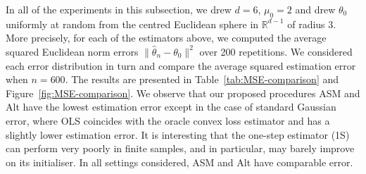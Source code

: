 \documentclass[a4paper]{article}
\newcommand{\norm}[1]{\|{#1}\|}
\theoremstyle{definition}
\newcommand{\green}[1]{{\color{green!70!black}#1}}
\begin{document}
In all of the experiments in this subsection, we drew $d = 6$, $\mu_0 = 2$ and drew $\theta_0$ uniformly at random from the centred Euclidean sphere in $\mathbb{R}^{d-1}$ of radius 3.  More precisely, for each of the estimators above, we computed the average squared Euclidean norm errors $\norm{\hat{\theta}_n - \theta_0}^2$ over 200 repetitions. We considered each error distribution in turn and compare the average squared estimation error when $n = 600$. The results are presented in Table~\ref{tab:MSE-comparison} and Figure~\ref{fig:MSE-comparison}. We observe that our proposed procedures ASM and Alt have the lowest estimation error except in the case of standard Gaussian error, where OLS coincides with the oracle convex loss estimator and has a slightly lower estimation error.  It is interesting that the one-step estimator (1S) can perform very poorly in finite samples, and in particular, may barely improve on its initialiser.  In all settings considered, ASM and Alt have comparable error. 



\end{document}
